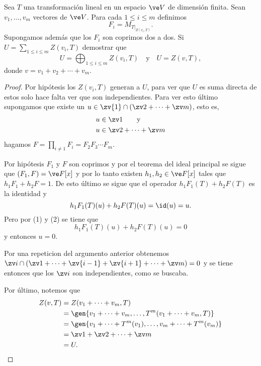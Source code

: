 

	\begin{teo}
			Sea $T$ una transformación lineal en un espacio $\ve V$ de dimensión finita. Sean $v_1,\dots,v_m$ vectores de $\ve V$. Para cada $1\leq i\leq m$ definimos 
		\[ F_i = M_{T|_{Z(v_i,T)}}. \]
		Supongamos además que los $F_i$ son coprimos dos a dos. Si $U=\sum_{1\leq i\leq m}Z(v_i,T)$ demostrar que
		\[ U=\bigoplus_{1\leq i\leq m}Z(v_i,T)\quad\text{y}\quad U=Z(v,T), \]
		donde $v=v_1+v_2+\cdots+v_m$.
	\end{teo}
	\begin{proof}
		Por hipótesis los $Z(v_i,T)$ generan a $U$, para ver que $U$ es suma directa de estos solo hace falta ver que son independientes. Para ver esto último supongamos que existe un $u\in \zv{1}\cap(\zv2+\cdots+\zv m)$, esto es,
		\begin{align}
			u&\in \zv 1\qquad\text{y} \\
			u&\in \zv2+\cdots+\zv m
		\end{align}
		hagamos $F = \prod_{i\neq 1}F_i = F_2F_3\cdots F_m$. 
		
		Por hipótesis $F_1$ y $F$ son coprimos y por el teorema del ideal principal se sigue que $(F_1,F) = \ve F[x]$ y por lo tanto existen $h_1,h_2\in\ve F[x]$ tales que $h_1F_1+h_2F = 1$. De esto último se sigue que el operador $h_1F_1(T)+h_2F(T)$ es la identidad y
		\[ h_1F_1(T)(u)+h_2F(T)(u) = \id(u) = u. \]
		Pero por (1) y (2) se tiene que
		\[ h_1F_1(T)(u)+h_2F(T)(u) = 0 \]
		y entonces $u=0$. 
		
		Por una repeticion del argumento anterior obtenemos $\zv i\cap(\zv1+\cdots+\zv{i-1}+\zv{i+1}+\cdots+\zv m) = 0$ y se tiene entonces que los $\zv i$ son independientes, como se buscaba.
		
		Por último, notemos que
		\allowdisplaybreaks
		\begin{align*}
			Z(v,T) &= Z(v_1+\cdots+v_m,T) \\
				   &= \gen\{v_1+\cdots+v_m,\dots,T^m(v_1+\cdots+v_m,T)\} \\
				   &= \gen\{ v_1+\cdots+T^m(v_1),\dots,v_m+\cdots+T^m(v_m) \} \\
				   &=\zv1+\zv2+\cdots+\zv m\\
				   &= U.
		\end{align*}
	\end{proof}
